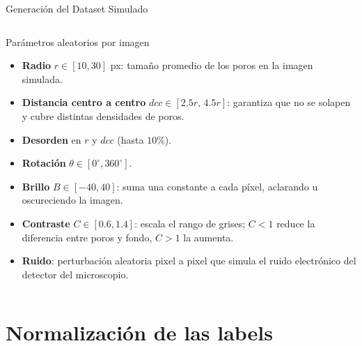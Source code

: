 \begin{frame}{Generación del Dataset Simulado}
\begin{columns}[t]
    \begin{block}{Parámetros aleatorios por imagen}
        \small
        \begin{itemize}
            \item \textbf{Radio} $r \in [10,30]$ px: tamaño promedio de los poros en la imagen simulada.
            \item \textbf{Distancia centro a centro} $dcc \in [2.5r,\,4.5r]$: garantiza que no se solapen y cubre distintas densidades de poros.
            \item \textbf{Desorden} en $r$ y $dcc$ (hasta $10\%$).
            \item \textbf{Rotación} $\theta \in [0^\circ,360^\circ]$.
            \item \textbf{Brillo} $B \in [-40,40]$: suma una constante a cada píxel, aclarando u oscureciendo la imagen.
            \item \textbf{Contraste} $C \in [0.6,1.4]$: escala el rango de grises; $C<1$ reduce la diferencia entre poros y fondo, $C>1$ la aumenta.
            \item \textbf{Ruido}: perturbación aleatoria pixel a pixel que simula el ruido electrónico del detector del microscopio.
        \end{itemize}
    \end{block} 

\end{columns}

\end{frame}

\section{Normalización de las labels}


